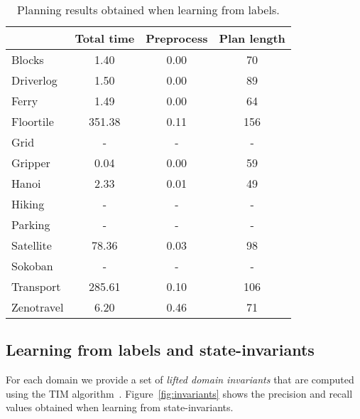 \documentclass{article}
\begin{document}
\begin{table}
	\begin{footnotesize}
		\begin{center}
			\begin{tabular}{l|c|c|c|}			
				& Total time & Preprocess & Plan length  \\
				\hline
				Blocks & 1.40 & 0.00 & 70  \\
				Driverlog & 1.50 & 0.00 & 89 \\
				Ferry & 1.49 & 0.00 & 64 \\
				Floortile & 351.38 & 0.11 & 156 \\
				Grid & - & - & - \\ %
				Gripper & 0.04 & 0.00 & 59 \\
				Hanoi & 2.33 & 0.01 & 49  \\
				Hiking & - & - & - \\ %
				Parking & - & - & - \\ %
				Satellite & 78.36 & 0.03 & 98 \\
				Sokoban & - & - & - \\ %
				Transport & 285.61 & 0.10 & 106 \\
				Zenotravel & 6.20 & 0.46 & 71 \\
			\end{tabular}
		\end{center}
	\end{footnotesize}
 \caption{\small Planning results obtained when learning from labels.}
\label{fig:planlabels}                        
\end{table}


\subsection{Learning from labels and state-invariants}
For each domain we provide a set of {\em lifted domain invariants} that are computed using the {\sc TIM} algorithm~\cite{fox:TIM:JAIR1998}. Figure~\ref{fig:invariants} shows the precision and recall values obtained when learning from state-invariants. 
\end{document}

